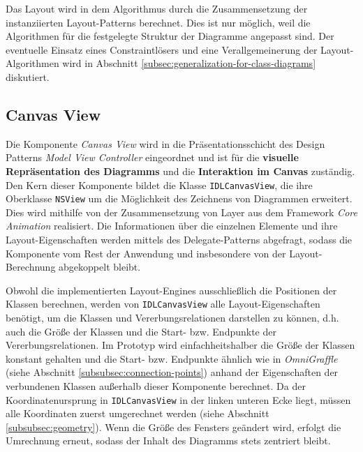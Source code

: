 Das Layout wird in dem Algorithmus durch die Zusammensetzung der instanziierten Layout-Patterns berechnet. Dies ist nur möglich, weil die Algorithmen für die festgelegte Struktur der Diagramme angepasst sind. Der eventuelle Einsatz eines Constraintlösers und eine Verallgemeinerung der Layout-Algorithmen wird in Abschnitt \ref{subsec:generalization-for-class-diagrams} diskutiert.

\subsection{Canvas View}
\label{subsec:canvas-view}

Die Komponente \textit{Canvas View} wird in die Präsentationsschicht des Design Patterns \textit{Model View Controller} eingeordnet und ist für die \textbf{visuelle Repräsentation des Diagramms} und die \textbf{Interaktion im Canvas} zuständig. Den Kern dieser Komponente bildet die Klasse \texttt{IDLCanvas\-View}, die ihre Oberklasse \texttt{NSView} um die Möglichkeit des Zeichnens von Diagrammen erweitert. Dies wird mithilfe von der Zusammensetzung von Layer aus dem Framework \textit{Core Animation} realisiert. Die Informationen über die einzelnen Elemente und ihre Layout-Eigenschaften werden mittels des Delegate-Patterns abgefragt, sodass die Komponente vom Rest der Anwendung und insbesondere von der Layout-Berechnung abgekoppelt bleibt.

Obwohl die implementierten Layout-Engines ausschließlich die Positionen der Klassen berechnen, werden von \texttt{IDLCanvasView} alle Layout-Eigenschaften benötigt, um die Klassen und Vererbungsrelationen darstellen zu können, d.h. auch die Größe der Klassen und die Start- bzw. Endpunkte der Vererbungsrelationen. Im Prototyp wird einfachheitshalber die Größe der Klassen konstant gehalten und die Start- bzw. Endpunkte ähnlich wie in \textit{OmniGraffle} (siehe Abschnitt \ref{subsubsec:connection-points}) anhand der Eigenschaften der verbundenen Klassen außerhalb dieser Komponente berechnet. Da der Koordinatenursprung in \texttt{IDLCanvasView} in der linken unteren Ecke liegt, müssen alle Koordinaten zuerst umgerechnet werden (siehe Abschnitt \ref{subsubsec:geometry}). Wenn die Größe des Fensters geändert wird, erfolgt die Umrechnung erneut, sodass der Inhalt des Diagramms stets zentriert bleibt.

